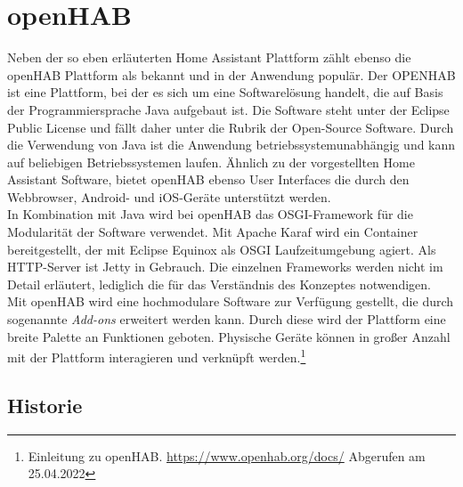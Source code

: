 \section{openHAB}
\label{sec:openhab}
    Neben der so eben erläuterten Home Assistant Plattform zählt ebenso die openHAB Plattform als bekannt und 
    in der Anwendung populär. Der \ac{OPENHAB} ist eine Plattform, bei der es sich um eine 
    Softwarelösung handelt, die auf Basis der Programmiersprache Java aufgebaut ist. Die Software steht unter 
    der Eclipse Public License und fällt daher unter die Rubrik der Open-Source Software. Durch die Verwendung 
    von Java ist die Anwendung betriebssystemunabhängig und kann auf beliebigen Betriebssystemen laufen. 
    Ähnlich zu der vorgestellten Home Assistant Software, bietet openHAB ebenso User Interfaces die durch 
    den Webbrowser, Android- und iOS-Geräte unterstützt werden. 
    \\
    \linebreak
    In Kombination mit Java wird bei openHAB das \ac{OSGI}-Framework für die Modularität der Software verwendet. Mit Apache 
    Karaf wird ein Container bereitgestellt, der mit Eclipse Equinox als \acs{OSGI} Laufzeitumgebung agiert. Als 
    \acs{HTTP}-Server ist Jetty in Gebrauch. Die einzelnen Frameworks werden nicht im Detail erläutert, lediglich die für das 
    Verständnis des Konzeptes notwendigen.
    \\
    \linebreak
    Mit openHAB wird eine hochmodulare Software zur Verfügung gestellt, die durch sogenannte \textit{Add-ons} erweitert 
    werden kann. Durch diese wird der Plattform eine breite Palette an Funktionen geboten. Physische Geräte können in 
    großer Anzahl mit der Plattform interagieren und verknüpft werden.\footnote{Einleitung zu openHAB. \url{https://www.openhab.org/docs/} Abgerufen am 25.04.2022}

    \subsection*{Historie}
    \label{sec:historyoHAB}

